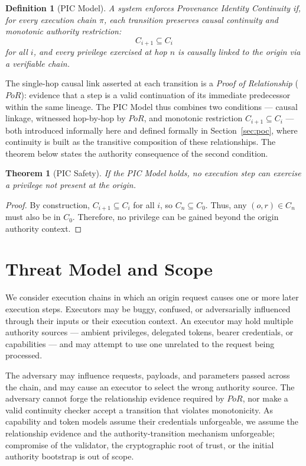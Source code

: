 \documentclass[11pt]{article}
\newtheorem{definition}{Definition}
\newtheorem{theorem}{Theorem}
\begin{document}
\begin{definition}[PIC Model]
A system enforces Provenance Identity Continuity if, for every execution chain
$\pi$, each transition preserves causal continuity and monotonic authority
restriction:
\[
C_{i+1} \subseteq C_i
\]
for all $i$, and every privilege exercised at hop $n$ is causally linked to the
origin via a verifiable chain.
\end{definition}

The single-hop causal link asserted at each transition is a \emph{Proof of
Relationship} ($PoR$): evidence that a step is a valid continuation of its
immediate predecessor within the same lineage. The PIC Model thus combines two
conditions --- causal linkage, witnessed hop-by-hop by $PoR$, and monotonic
restriction $C_{i+1}\subseteq C_i$ --- both introduced informally here and
defined formally in Section~\ref{sec:poc}, where continuity is built as the
transitive composition of these relationships. The theorem below states the
authority consequence of the second condition.

\begin{theorem}[PIC Safety]
If the PIC Model holds, no execution step can exercise a privilege not present
at the origin.
\end{theorem}

\begin{proof}
By construction, $C_{i+1} \subseteq C_i$ for all $i$, so $C_n \subseteq C_0$.
Thus, any $(o,r) \in C_n$ must also be in $C_0$.
Therefore, no privilege can be gained beyond the origin authority context.
\end{proof}

\section{Threat Model and Scope}

We consider execution chains in which an origin request causes one or more later
execution steps. Executors may be buggy, confused, or adversarially influenced
through their inputs or their execution context. An executor may hold multiple authority sources --- ambient
privileges, delegated tokens, bearer credentials, or capabilities --- and may
attempt to use one unrelated to the request being processed.

The adversary may influence requests, payloads, and parameters passed across the
chain, and may cause an executor to select the wrong authority source. The
adversary cannot forge the relationship evidence required by $PoR$, nor make a
valid continuity checker accept a transition that violates monotonicity. As
capability and token models assume their credentials unforgeable, we assume the
relationship evidence and the authority-transition mechanism unforgeable;
compromise of the validator, the cryptographic root of trust, or the initial
authority bootstrap is out of scope.
\end{document}

